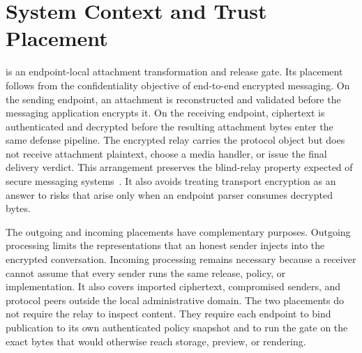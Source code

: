 \section{System Context and Trust Placement}\label{sec:system-context}

\AFD{} is an endpoint-local attachment transformation and release gate. Its
placement follows from the confidentiality objective of end-to-end encrypted
messaging. On the sending endpoint, an attachment is reconstructed and
validated before the messaging application encrypts it. On the receiving
endpoint, ciphertext is authenticated and decrypted before the resulting
attachment bytes enter the same defense pipeline. The encrypted relay carries
the protocol object but does not receive attachment plaintext, choose a media
handler, or issue the final delivery verdict. This arrangement preserves the
blind-relay property expected of secure messaging systems~\cite{unger2015}.
It also avoids treating transport encryption as an answer to risks that arise
only when an endpoint parser consumes decrypted bytes.

The outgoing and incoming placements have complementary purposes. Outgoing
processing limits the representations that an honest sender injects into the
encrypted conversation. Incoming processing remains necessary because a
receiver cannot assume that every sender runs the same release, policy, or
implementation. It also covers imported ciphertext, compromised senders, and
protocol peers outside the local administrative domain. The two placements do
not require the relay to inspect content. They require each endpoint to bind
publication to its own authenticated policy snapshot and to run the gate on
the exact bytes that would otherwise reach storage, preview, or rendering.


